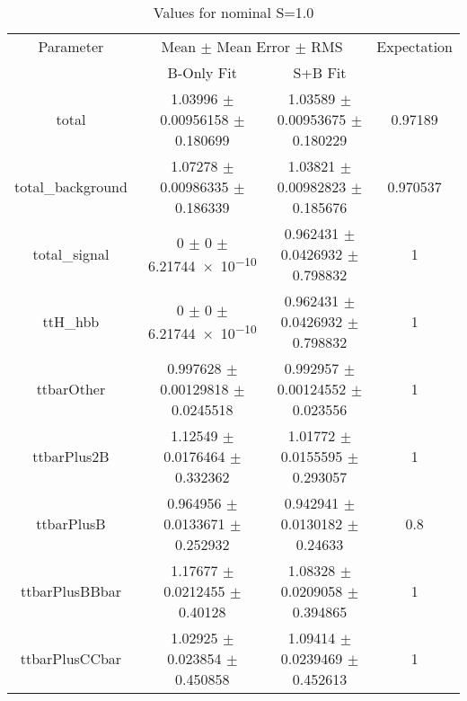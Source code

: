 \begin{table}
\centering
\caption{Values for nominal S=1.0}
\begin{tabular}{cccc}
\toprule
Parameter & \multicolumn{2}{c}{Mean $\pm$ Mean Error $\pm$ RMS} & Expectation\\
 & B-Only Fit & S+B Fit & \\
\midrule
total & \num{1.03996} $\pm$ \num{0.00956158} $\pm$ \num{0.180699} & \num{1.03589} $\pm$ \num{0.00953675} $\pm$ \num{0.180229} & \num{0.97189}\\
total\_background & \num{1.07278} $\pm$ \num{0.00986335} $\pm$ \num{0.186339} & \num{1.03821} $\pm$ \num{0.00982823} $\pm$ \num{0.185676} & \num{0.970537}\\
total\_signal & \num{0} $\pm$ \num{0} $\pm$ \num{6.21744e-10} & \num{0.962431} $\pm$ \num{0.0426932} $\pm$ \num{0.798832} & \num{1}\\
ttH\_hbb & \num{0} $\pm$ \num{0} $\pm$ \num{6.21744e-10} & \num{0.962431} $\pm$ \num{0.0426932} $\pm$ \num{0.798832} & \num{1}\\
ttbarOther & \num{0.997628} $\pm$ \num{0.00129818} $\pm$ \num{0.0245518} & \num{0.992957} $\pm$ \num{0.00124552} $\pm$ \num{0.023556} & \num{1}\\
ttbarPlus2B & \num{1.12549} $\pm$ \num{0.0176464} $\pm$ \num{0.332362} & \num{1.01772} $\pm$ \num{0.0155595} $\pm$ \num{0.293057} & \num{1}\\
ttbarPlusB & \num{0.964956} $\pm$ \num{0.0133671} $\pm$ \num{0.252932} & \num{0.942941} $\pm$ \num{0.0130182} $\pm$ \num{0.24633} & \num{0.8}\\
ttbarPlusBBbar & \num{1.17677} $\pm$ \num{0.0212455} $\pm$ \num{0.40128} & \num{1.08328} $\pm$ \num{0.0209058} $\pm$ \num{0.394865} & \num{1}\\
ttbarPlusCCbar & \num{1.02925} $\pm$ \num{0.023854} $\pm$ \num{0.450858} & \num{1.09414} $\pm$ \num{0.0239469} $\pm$ \num{0.452613} & \num{1}\\
\bottomrule
\end{tabular}
\end{table}